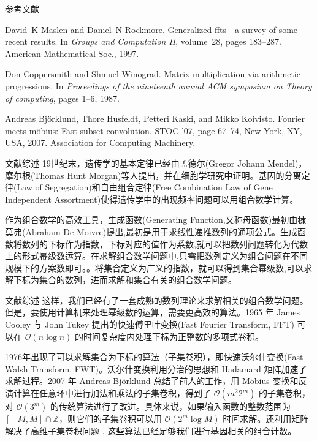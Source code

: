 \documentclass[10pt,aspectratio=43,mathserif]{ctexbeamer}
\begin{document}
	\begin{frame}{参考文献}
		\begin{thebibliography}{3}
			David~K Maslen and Daniel~N Rockmore.
			\newblock Generalized ffts—a survey of some recent results.
			\newblock In {\em Groups and Computation II}, volume~28, pages 183--287.
			American Mathematical Soc., 1997.
			
			Don Coppersmith and Shmuel Winograd.
			\newblock Matrix multiplication via arithmetic progressions.
			\newblock In {\em Proceedings of the nineteenth annual ACM symposium on Theory
				of computing}, pages 1--6, 1987.
			
			Andreas Bj\"{o}rklund, Thore Husfeldt, Petteri Kaski, and Mikko Koivisto.
			\newblock Fourier meets m\"{o}bius: Fast subset convolution.
			\newblock STOC '07, page 67–74, New York, NY, USA, 2007. Association for
			Computing Machinery.
		\end{thebibliography}
	\end{frame}

	\begin{frame}{文献综述}
		19世纪末，遗传学的基本定律已经由孟德尔(Gregor Johann Mendel)，摩尔根(Thomas Hunt Morgan)等人提出，并在细胞学研究中证明。基因的分离定律(Law of Segregation)和自由组合定律(Free Combination Law of Gene Independent Assortment)使得遗传学中的出现频率问题可以用组合数学计算。\cite{2009陈阅增普通生物学}
		
		作为组合数学的高效工具，生成函数(Generating Function,又称母函数)最初由棣莫弗(Abraham De Moivre)提出,最初是用于求线性递推数列的通项公式。\cite{knuth2005art}生成函数将数列的下标作为指数，下标对应的值作为系数,就可以把数列问题转化为代数上的形式幂级数运算。在求解组合数学问题中,只需把数列定义为组合问题在不同规模下的方案数即可。\cite{graham1989concrete}。将集合定义为广义的指数，就可以得到集合幂级数,可以求解下标为集合的数列，进而求解和集合有关的组合数学问题。
	\end{frame}

	\begin{frame}{文献综述}
		这样，我们已经有了一套成熟的数列理论来求解相关的组合数学问题。但是，要使用计算机来处理幂级数的运算，需要更高效的算法。1965 年 James Cooley 与 John Tukey 提出的快速傅里叶变换(Fast Fourier Transform, FFT)\cite{cooley1965algorithm} 可以在 $\mathcal{O}(n\log n)$ 的时间复杂度内处理下标为正整数的多项式卷积。
		
		1976年出现了可以求解集合为下标的算法（子集卷积），即快速沃尔什变换(Fast Walsh Transform, FWT)\cite{maslen1997generalized}。沃尔什变换利用分治的思想和 Hadamard 矩阵加速了求解过程\cite{coppersmith1987matrix}。2007 年 Andreas Björklund 总结了前人的工作，用 Möbius 变换和反演计算在任意环中进行加法和乘法的子集卷积，得到了 $\mathcal{O}(m^2 2^m)$ 的子集卷积，对 $\mathcal{O}(3^m)$ 的传统算法进行了改进。具体来说，如果输入函数的整数范围为 $[-M,M]\cap \mathbb{Z}$，则它们的子集卷积可以用 $\mathcal{O}(2^m\log M)$ 时间求解。还利用矩阵解决了高维子集卷积问题 \cite{10.1145/1250790.1250801}. 这些算法已经足够我们进行基因相关的组合计数。
	\end{frame}
\end{document}
